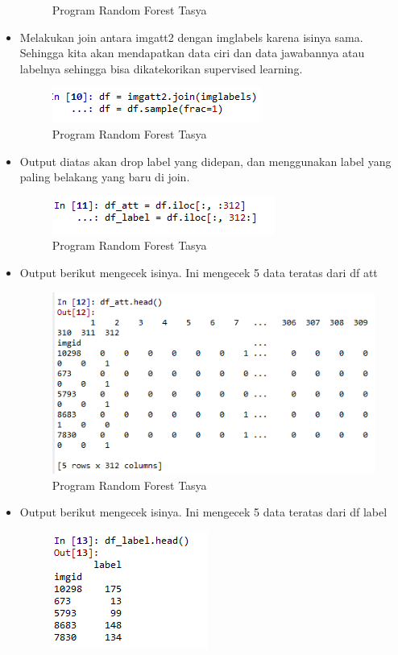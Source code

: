 \begin{itemize}
\begin{figure}[ht]
\caption{Program Random Forest Tasya}
\label{Praktek}
\end{figure}
\item Melakukan join antara imgatt2 dengan imglabels karena isinya sama. Sehingga kita akan mendapatkan data ciri dan data jawabannya atau labelnya sehingga bisa dikatekorikan supervised learning.
\begin{figure}[ht]
\centering
\includegraphics[scale=0.5]{figures/rf10.png}
\caption{Program Random Forest Tasya}
\label{Praktek}
\end{figure}
\item Output diatas akan drop label yang didepan, dan menggunakan label yang paling belakang yang baru di join.
\begin{figure}[ht]
\centering
\includegraphics[scale=0.5]{figures/rf11.png}
\caption{Program Random Forest Tasya}
\label{Praktek}
\end{figure}
\item Output berikut mengecek isinya. Ini mengecek 5 data teratas dari df att
\begin{figure}[ht]
\centering
\includegraphics[scale=0.5]{figures/rf12.png}
\caption{Program Random Forest Tasya}
\label{Praktek}
\end{figure}
\item Output berikut mengecek isinya. Ini mengecek 5 data teratas dari df label
\begin{figure}[ht]
\centering
\includegraphics[scale=0.5]{figures/rf13.png}

\end{figure}
\end{itemize}
